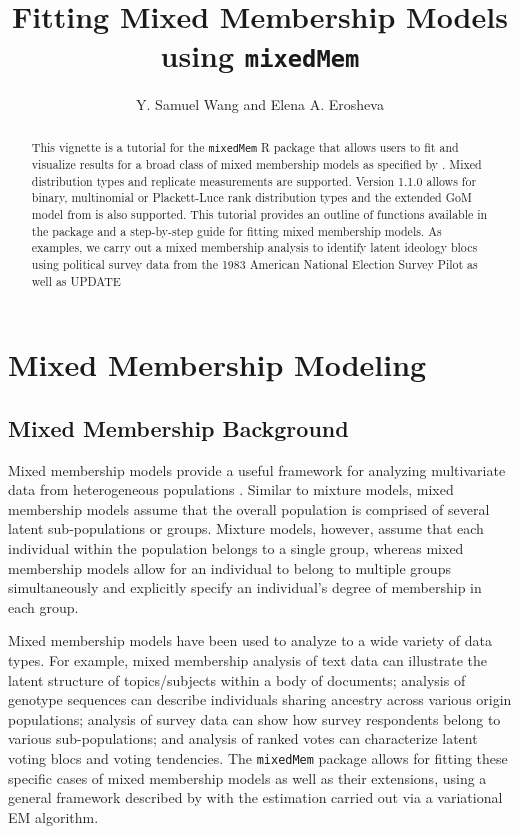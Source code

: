 \documentclass{article}
\begin{document}

\title{Fitting Mixed Membership Models using \texttt{mixedMem}}
\author{Y. Samuel Wang and Elena A. Erosheva}
\maketitle

\small
\begin{abstract}
This vignette is a tutorial for the \texttt{mixedMem} R package that allows users to fit and visualize results for a broad class of mixed membership models as specified by \cite{erosheva2004mixed}. Mixed distribution types and replicate measurements are supported. Version 1.1.0 allows for binary, multinomial or Plackett-Luce rank distribution types and the extended GoM model from \cite{erosheva2007describing} is also supported. This tutorial provides an outline of functions available in the package and a step-by-step guide for fitting mixed membership models. As examples, we carry out a mixed membership analysis to identify latent ideology blocs using political survey data from the 1983 American National Election Survey Pilot as well as UPDATE  
\end{abstract}

\normalsize
\section{Mixed Membership Modeling} \label{MMM}
\subsection{Mixed Membership Background}
Mixed membership models provide a useful framework for analyzing multivariate data from heterogeneous populations \citep{Airoldi2014Handbook}. Similar to mixture models, mixed membership models assume that the overall population is comprised of several latent sub-populations or groups. Mixture models, however, assume that each individual within the population belongs to a single group, whereas mixed membership models allow for an individual to belong to multiple groups simultaneously and explicitly specify an individual's degree of membership in each group.

Mixed membership models have been used to analyze to a wide variety of data types. For example, mixed membership analysis of text data \citep{LDA, erosheva2004mixed} can illustrate the latent structure of topics/subjects within a body of documents; analysis of genotype sequences \citep{pritchard2000inference} can describe individuals sharing ancestry across various origin populations; analysis of survey data \citep{erosheva2007describing, grossManriqueVallier} can show how survey respondents belong to various sub-populations; and analysis of ranked votes \citep{gormley2009grade} can characterize latent voting blocs and voting tendencies. The \texttt{mixedMem} package allows for fitting these specific cases of mixed membership models as well as their extensions, using a general framework described by \cite{erosheva2004mixed} with the estimation carried out via a variational EM algorithm.
\end{document}
